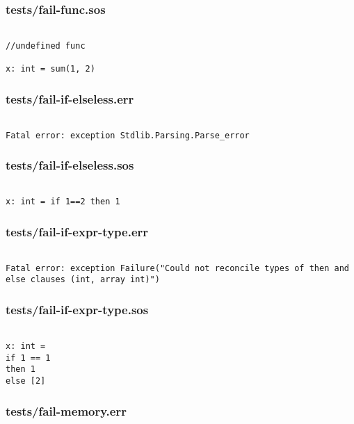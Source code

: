 \documentclass[main.tex]{subfiles}
\begin{document}
\subsubsection{tests/fail-func.sos}

\begin{lstlisting}

//undefined func

x: int = sum(1, 2)
\end{lstlisting}

\subsubsection{tests/fail-if-elseless.err}

\begin{lstlisting}

Fatal error: exception Stdlib.Parsing.Parse_error
\end{lstlisting}

\subsubsection{tests/fail-if-elseless.sos}

\begin{lstlisting}

x: int = if 1==2 then 1
\end{lstlisting}

\subsubsection{tests/fail-if-expr-type.err}

\begin{lstlisting}

Fatal error: exception Failure("Could not reconcile types of then and else clauses (int, array int)")
\end{lstlisting}

\subsubsection{tests/fail-if-expr-type.sos}

\begin{lstlisting}

x: int = 
if 1 == 1 
then 1
else [2]
\end{lstlisting}

\subsubsection{tests/fail-memory.err}
\end{document}
